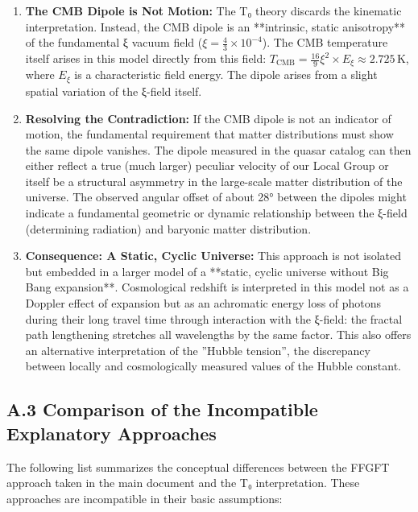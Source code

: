 	\begin{enumerate}
		\item \textbf{The CMB Dipole is Not Motion:} The T₀ theory discards the kinematic interpretation. Instead, the CMB dipole is an **intrinsic, static anisotropy** of the fundamental ξ vacuum field ($ \xi = \frac{4}{3} \times 10^{-4} $). The CMB temperature itself arises in this model directly from this field: $ T_{\text{CMB}} = \frac{16}{9} \xi^2 \times E_\xi \approx 2.725 \, \text{K} $, where $E_\xi$ is a characteristic field energy. The dipole arises from a slight spatial variation of the ξ-field itself.
		
		\item \textbf{Resolving the Contradiction:} If the CMB dipole is not an indicator of motion, the fundamental requirement that matter distributions must show the same dipole vanishes. The dipole measured in the quasar catalog can then either reflect a true (much larger) peculiar velocity of our Local Group or itself be a structural asymmetry in the large-scale matter distribution of the universe. The observed angular offset of about 28° between the dipoles might indicate a fundamental geometric or dynamic relationship between the ξ-field (determining radiation) and baryonic matter distribution.
		
		\item \textbf{Consequence: A Static, Cyclic Universe:} This approach is not isolated but embedded in a larger model of a **static, cyclic universe without Big Bang expansion**. Cosmological redshift is interpreted in this model not as a Doppler effect of expansion but as an achromatic energy loss of photons during their long travel time through interaction with the ξ-field: the fractal path lengthening stretches all wavelengths by the same factor. This also offers an alternative interpretation of the ''Hubble tension'', the discrepancy between locally and cosmologically measured values of the Hubble constant.
	\end{enumerate}
	
	\subsection*{A.3 Comparison of the Incompatible Explanatory Approaches}
	
	The following list summarizes the conceptual differences between the FFGFT approach taken in the main document and the T₀ interpretation. These approaches are incompatible in their basic assumptions:
	
